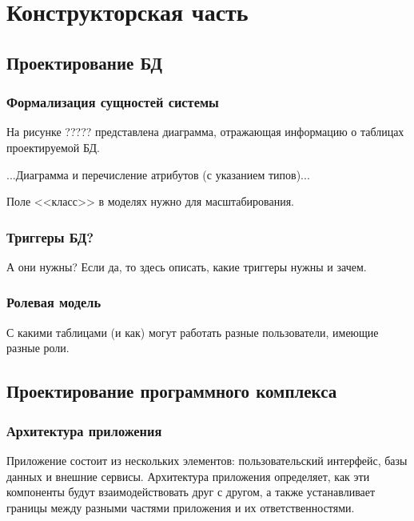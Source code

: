 \section{Конструкторская часть}


\subsection{Проектирование БД}

\subsubsection{Формализация сущностей системы}

На рисунке ????? представлена диаграмма, отражающая информацию о таблицах проектируемой БД.

...Диаграмма и перечисление атрибутов (с указанием типов)...

Поле <<класс>> в моделях нужно для масштабирования.

\subsubsection{Триггеры БД?}

А они нужны? Если да, то здесь описать, какие триггеры нужны и зачем.

\subsubsection{Ролевая модель}

С какими таблицами (и как) могут работать разные пользователи, имеющие разные роли.



\subsection{Проектирование программного комплекса}

\subsubsection{Архитектура приложения}

Приложение состоит из нескольких элементов: пользовательский интерфейс, базы данных и внешние сервисы. Архитектура приложения определяет, как эти компоненты будут взаимодействовать друг с другом, а также устанавливает границы между разными частями приложения и их ответственностями.

